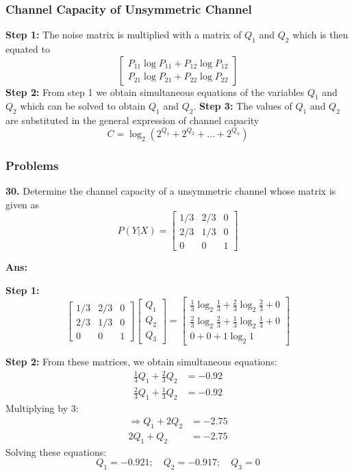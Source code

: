 \documentclass[12pt]{article}
\begin{document}
\subsubsection{Channel Capacity of Unsymmetric Channel}
\textbf{Step 1:} The noise matrix is multiplied with a matrix of $Q_1$ and $Q_2$ which is then equated to 
$$\begin{bmatrix}
P_{11} \log P_{11} + P_{12} \log P_{12} \\ 
P_{21} \log P_{21} + P_{22} \log P_{22}
\end{bmatrix}$$ 
\textbf{Step 2:} From step 1 we obtain simultaneous equations of the variables $Q_1$ and $Q_2$ which can be solved to obtain $Q_1$ and $Q_2$. 
\textbf{Step 3:} The values of $Q_1$ and $Q_2$ are substituted in the general expression of channel capacity 
$$C = \log_2(2^{Q_1} + 2^{Q_2} + \dots + 2^{Q_n})$$ 
\subsubsection*{Problems}

\textbf{30.} Determine the channel capacity of a unsymmetric channel whose matrix is given as
$$ P(Y|X) = \begin{bmatrix} 
1/3 & 2/3 & 0 \\ 
2/3 & 1/3 & 0 \\ 
0 & 0 & 1 
\end{bmatrix} $$

\textbf{Ans:}

\textbf{Step 1:}
$$ \begin{bmatrix} 
1/3 & 2/3 & 0 \\ 
2/3 & 1/3 & 0 \\ 
0 & 0 & 1 
\end{bmatrix} 
\begin{bmatrix} Q_1 \\ Q_2 \\ Q_3 \end{bmatrix} = 
\begin{bmatrix} 
\frac{1}{3}\log_2\frac{1}{3} + \frac{2}{3}\log_2\frac{2}{3} + 0 \\ 
\frac{2}{3}\log_2\frac{2}{3} + \frac{1}{3}\log_2\frac{1}{3} + 0 \\ 
0 + 0 + 1 \log_2 1 
\end{bmatrix} $$

\textbf{Step 2:}
From these matrices, we obtain simultaneous equations:
\begin{align*}
\frac{1}{3}Q_1 + \frac{2}{3}Q_2 &= -0.92 \\
\frac{2}{3}Q_1 + \frac{1}{3}Q_2 &= -0.92
\end{align*}
Multiplying by 3:
\begin{align*}
\Rightarrow Q_1 + 2Q_2 &= -2.75 \\
2Q_1 + Q_2 &= -2.75
\end{align*}
Solving these equations:
$$ Q_1 = -0.921; \quad Q_2 = -0.917; \quad Q_3 = 0 $$
\end{document}
